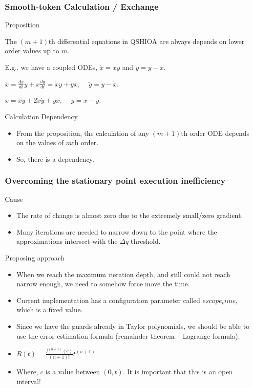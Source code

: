 \begin{frame}[c] \frametitle{ Smooth-token Calculation / Exchange }
	\begin{block}{Proposition}
		\begin{myitemize}
			\item The $(m+1)$th differential equations in QSHIOA are always depends on lower order values up to $m$.
			\item E.g., we have a coupled ODEs, $\dot{x} = xy$ and $\dot{y} = y - x$.
			\item $\ddot{x} = \frac{dx}{dt} y + x \frac{dy}{dt} = \dot{x}y + \dot{y}x$, $\quad \ddot{y} = \dot{y} - \dot{x}$.
			\item $\dddot{x} = \ddot{x}y + 2\dot{x}\dot{y} + \ddot{y}x$, $\quad \dddot{y} = \ddot{x} - \ddot{y}$.
		\end{myitemize}
	\end{block}
	\begin{block}{Calculation Dependency}
		\begin{itemize}
			\item From the proposition, the calculation of any $(m+1)$th order ODE depends on the values of $m$th order.
			\item So, there is a dependency.
		\end{itemize}
	\end{block}
\end{frame}

\begin{frame}[c] \frametitle{Overcoming the stationary point execution inefficiency}
	\begin{block}{Cause}
		\begin{itemize}
			\item The rate of change is almost zero due to the extremely small/zero gradient.
			\item Many iterations are needed to narrow down to the point where the approximations intersect with the $\Delta q$ threshold.
		\end{itemize}
	\end{block}
	\begin{block}{Proposing approach}
		\begin{itemize}
			\item When we reach the maximum iteration depth, and still could not reach narrow enough, we need to somehow force move the time.
			\item Current implementation has a configuration parameter called $escape_time$, which is a fixed value.
			\item Since we have the guards already in Taylor polynomials, we should be able to use the error estimation formula (remainder theorem -- Lagrange formula). 
			\item $R(t) = \frac{f^{(n+1)}(c)}{(n+1)!}t^{(n+1)}$
			\item Where, $c$ is a value between $(0, t)$. It is important that this is an open interval!
		\end{itemize}
	\end{block}
\end{frame}

